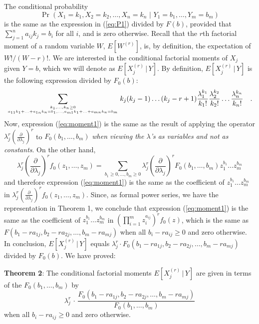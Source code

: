 \documentclass[11pt]{article}
\newcommand{\atopnew}[2]{\genfrac{}{}{0pt}{}{#1}{#2}}
\begin{document}
The conditional probability
\[
\Pr\left(X_1=k_1, X_2=k_2, \ldots  , X_n=k_n
        \,\, \bigl \vert \, \, Y_1=b_1, \ldots  , Y_m=b_m\right)
\]
is the same as the expression in (\ref{eq:P1})
divided by $F(b)$, provided that $\sum_{j=1}^{n} a_{ij} k_j=b_i$ for all $i$,
and is zero otherwise.
Recall that the $r$th factorial moment of a random variable $W$, $E[W^{(r)}]$,
is, by definition, the expectation of $W!/(W-r)!$.
We are interested in the conditional factorial moments of $X_j$ given $Y=b$,
which we will denote as
$E[X_j^{(r)}\, \bigl \vert \, Y]$.
By definition,
$E[X_j^{(r)}\, \bigl \vert \, Y]$
is the following expression divided by $F_0(b)$: %
\begin{equation}
\label{eq:moment1}
\sum_{
\atopnew{k_1, \ldots , k_n \geq 0}
{a_{11} k_1 + \ldots  + a_{1n} k_n=b_1 , \ldots  ,
a_{m1} k_1 + \ldots  + a_{mn} k_n=b_m}}
k_j(k_j-1)\ldots  (k_j-r+1)
\frac{\lambda _1^{k_1}}{k_1!}\frac{\lambda _2^{k_2}}{k_2!} \ldots 
\frac{\lambda _n^{k_n}}{k_n!} \quad .
\end{equation}
Now, expression (\ref{eq:moment1}) is the same as
the result of applying the operator
$\lambda _j^r (\frac{\partial}{\partial \lambda _j})^r$ to
$F_0(b_1, \ldots , b_m)$
\emph{when viewing the $\lambda $'s as variables and not as constants}.
On the other hand,
\[
\lambda _j^r (\frac{\partial}{\partial \lambda _j})^r f_0(z_1,\ldots ,z_m)
=
\sum_{b_1 \geq 0, \ldots , b_m \geq 0}
\lambda _j^r (\frac{\partial}{\partial \lambda _j})^r
F_0(b_1, \ldots , b_m) z_1^{b_1} \ldots  z_m^{b_m}
\]
and therefore expression (\ref{eq:moment1}) is the same as the
coefficient of $z_1^{b_1} \ldots  z_m^{b_m}$ in
$\lambda _j^r (\frac{\partial}{\partial \lambda _j})^r f_0(z_1,\ldots ,z_m)$.
Since, as formal power series, we have the representation in Theorem 1,
we conclude that expression (\ref{eq:moment1}) is the same as
the coefficient of
$z_1^{b_1} \ldots  z_m^{b_m}$ in
$(\prod_{i=1}^{m} z_i^{a_{ij}})^r f_0(z)$,
which is the same as
$F(b_1-ra_{1j},b_2- ra_{2j}, \ldots , b_m-ra_{mj})$
when all $b_i-ra_{ij}\geq 0$ and zero otherwise.
In conclusion, $E[X_j^{(r)}\, \bigl \vert \, Y]$
equals 
$\lambda _j^r\cdot F_0(b_1-ra_{1j},b_2- ra_{2j}, \ldots , b_m-ra_{mj})$
divided by $F_0(b)$.
We have proved:

{\bf Theorem 2}: The conditional factorial moments
$E[X_j^{(r)}\, \bigl \vert \, Y]$ are given in terms of the
$F_0(b_1, \ldots  , b_m)$ by
\[
\lambda _j^r \, \cdot \,
\frac{F_0(b_1-ra_{1j},b_2- ra_{2j}, \ldots , b_m-ra_{mj}) }%
{F_0(b_1, \ldots , b_m)}
\]
when all $b_i-ra_{ij}\geq 0$ and zero otherwise.
\end{document}
